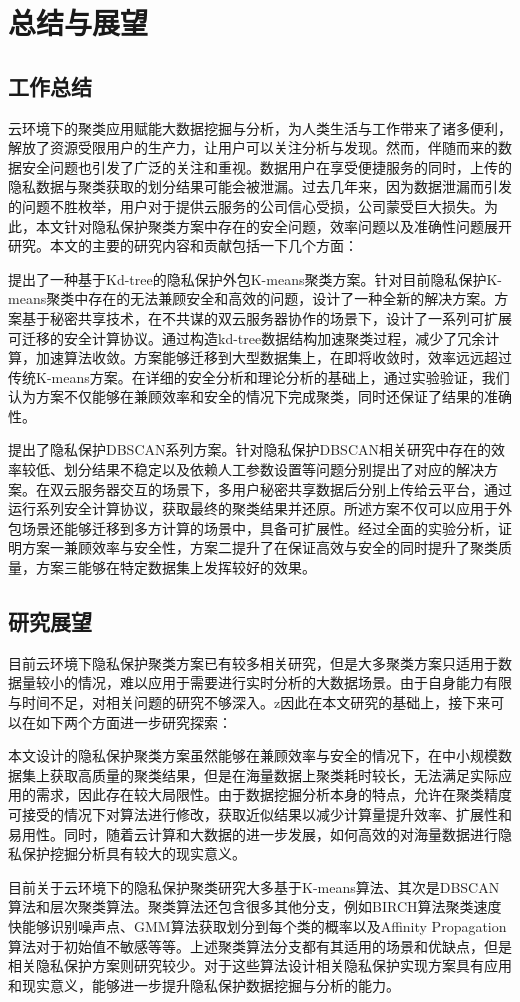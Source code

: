\chapter{总结与展望}
\section{工作总结}
云环境下的聚类应用赋能大数据挖掘与分析，为人类生活与工作带来了诸多便利，解放了资源受限用户的生产力，让用户可以关注分析与发现。然而，伴随而来的数据安全问题也引发了广泛的关注和重视。数据用户在享受便捷服务的同时，上传的隐私数据与聚类获取的划分结果可能会被泄漏。过去几年来，因为数据泄漏而引发的问题不胜枚举，用户对于提供云服务的公司信心受损，公司蒙受巨大损失。为此，本文针对隐私保护聚类方案中存在的安全问题，效率问题以及准确性问题展开研究。本文的主要的研究内容和贡献包括一下几个方面：

\begin{compactitem}
	\item 
	提出了一种基于Kd-tree的隐私保护外包K-means聚类方案。针对目前隐私保护K-means聚类中存在的无法兼顾安全和高效的问题，设计了一种全新的解决方案。方案基于秘密共享技术，在不共谋的双云服务器协作的场景下，设计了一系列可扩展可迁移的安全计算协议。通过构造kd-tree数据结构加速聚类过程，减少了冗余计算，加速算法收敛。方案能够迁移到大型数据集上，在即将收敛时，效率远远超过传统K-means方案。在详细的安全分析和理论分析的基础上，通过实验验证，我们认为方案不仅能够在兼顾效率和安全的情况下完成聚类，同时还保证了结果的准确性。
	\item 
	提出了隐私保护DBSCAN系列方案。针对隐私保护DBSCAN相关研究中存在的效率较低、划分结果不稳定以及依赖人工参数设置等问题分别提出了对应的解决方案。在双云服务器交互的场景下，多用户秘密共享数据后分别上传给云平台，通过运行系列安全计算协议，获取最终的聚类结果并还原。所述方案不仅可以应用于外包场景还能够迁移到多方计算的场景中，具备可扩展性。经过全面的实验分析，证明方案一兼顾效率与安全性，方案二提升了在保证高效与安全的同时提升了聚类质量，方案三能够在特定数据集上发挥较好的效果。
\end{compactitem}

\section{研究展望}
目前云环境下隐私保护聚类方案已有较多相关研究，但是大多聚类方案只适用于数据量较小的情况，难以应用于需要进行实时分析的大数据场景。由于自身能力有限与时间不足，对相关问题的研究不够深入。z因此在本文研究的基础上，接下来可以在如下两个方面进一步研究探索：

本文设计的隐私保护聚类方案虽然能够在兼顾效率与安全的情况下，在中小规模数据集上获取高质量的聚类结果，但是在海量数据上聚类耗时较长，无法满足实际应用的需求，因此存在较大局限性。由于数据挖掘分析本身的特点，允许在聚类精度可接受的情况下对算法进行修改，获取近似结果以减少计算量提升效率、扩展性和易用性。同时，随着云计算和大数据的进一步发展，如何高效的对海量数据进行隐私保护挖掘分析具有较大的现实意义。

目前关于云环境下的隐私保护聚类研究大多基于K-means算法、其次是DBSCAN算法和层次聚类算法。聚类算法还包含很多其他分支，例如BIRCH算法聚类速度快能够识别噪声点、GMM算法获取划分到每个类的概率以及Affinity Propagation算法对于初始值不敏感等等。上述聚类算法分支都有其适用的场景和优缺点，但是相关隐私保护方案则研究较少。对于这些算法设计相关隐私保护实现方案具有应用和现实意义，能够进一步提升隐私保护数据挖掘与分析的能力。